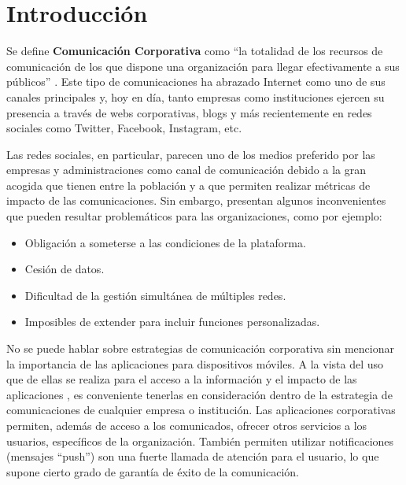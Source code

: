 \section{Introducción}

Se define \textbf{Comunicación Corporativa} como ``la totalidad de los recursos de comunicación de los que dispone una organización para llegar efectivamente a sus públicos'' \cite{riel_2001}. Este tipo de comunicaciones ha abrazado Internet como uno de sus canales principales y, hoy en día, tanto empresas como instituciones ejercen su presencia a través de webs corporativas, blogs y más recientemente en redes sociales como Twitter, Facebook, Instagram, etc.

Las redes sociales, en particular, parecen uno de los medios preferido por las empresas \cite{linkedin} y administraciones \cite{grande2015casos} como canal de comunicación debido a la gran acogida que tienen entre la población y a que permiten realizar métricas de impacto de las comunicaciones. Sin embargo, presentan algunos inconvenientes que pueden resultar problemáticos para las organizaciones, como por ejemplo:
\begin{itemize}
    \item Obligación a someterse a las condiciones de la plataforma.
    \item Cesión de datos.
    \item Dificultad de la gestión simultánea de múltiples redes.
    \item Imposibles de extender para incluir funciones personalizadas.
\end {itemize}

No se puede hablar sobre estrategias de comunicación corporativa sin mencionar la importancia de las aplicaciones para dispositivos móviles. A la vista del uso que de ellas se realiza para el acceso a la información y el impacto de las aplicaciones \cite{playstore} \cite{appstore}, es conveniente tenerlas en consideración dentro de la estrategia de comunicaciones de cualquier empresa o institución. Las aplicaciones corporativas permiten, además de acceso a los comunicados, ofrecer otros servicios a los usuarios, específicos de la organización. También permiten utilizar notificaciones (mensajes ``push'') son una fuerte llamada de atención para el usuario, lo que supone cierto grado de garantía de éxito de la comunicación.

